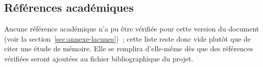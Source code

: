   \subsection{R\'ef\'erences acad\'emiques}\label{sec:annexe-references}

  Aucune r\'ef\'erence acad\'emique n'a pu \^etre v\'erifi\'ee pour cette version du document (voir la
  section~\ref{sec:annexe-lacunes})~; cette liste reste donc vide plut\^ot que de citer une \'etude de
  m\'emoire. Elle se remplira d'elle-m\^eme d\`es que des r\'ef\'erences v\'erifi\'ees seront ajout\'ees
  au fichier bibliographique du projet.
\fi
